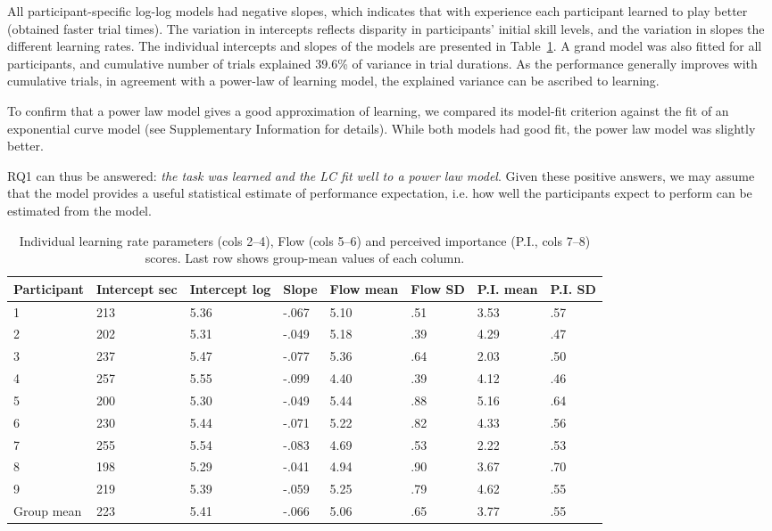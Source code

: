 All participant-specific log-log models had negative slopes, which indicates that with experience each participant learned to play better (obtained faster trial times). The variation in intercepts reflects disparity in participants' initial skill levels, and the variation in slopes the different learning rates. The individual intercepts and slopes of the models are presented in Table~\ref{tab:LCxFlow}. A grand model was also fitted for all participants, and cumulative number of trials explained 39.6\% of variance in trial durations. As the performance generally improves with cumulative trials, in agreement with a power-law of learning model, the explained variance can be ascribed to learning.

To confirm that a power law model gives a good approximation of learning, we compared its model-fit criterion against the fit of an exponential curve model (see Supplementary Information for details). While both models had good fit, the power law model was slightly better.

RQ1 can thus be answered: {\it the task was learned and the LC fit well to a power law model}. Given these positive answers, we may assume that the model provides a useful statistical estimate of performance expectation, i.e. how well the participants expect to perform can be estimated from the model.

\begin{table}[ht]
\centering
\caption{\label{tab:LCxFlow}Individual learning rate parameters (cols 2--4), Flow (cols 5--6) and perceived importance (P.I., cols 7--8) scores. Last row shows group-mean values of each column.}
\begin{tabular}{llllllll}
\hline
Participant & Intercept sec & Intercept log & Slope  & Flow mean & Flow SD & P.I. mean & P.I. SD \\
\hline
1           & 213     & 5.36      & -.067 & 5.10      & .51     & 3.53      & .57     \\
2           & 202     & 5.31      & -.049 & 5.18      & .39     & 4.29      & .47     \\
3           & 237     & 5.47      & -.077 & 5.36      & .64     & 2.03      & .50     \\
4           & 257     & 5.55      & -.099 & 4.40      & .39     & 4.12      & .46     \\
5           & 200     & 5.30      & -.049 & 5.44      & .88     & 5.16      & .64     \\
6           & 230     & 5.44      & -.071 & 5.22      & .82     & 4.33      & .56     \\
7           & 255     & 5.54      & -.083 & 4.69      & .53     & 2.22      & .53     \\
8           & 198     & 5.29      & -.041 & 4.94      & .90     & 3.67      & .70     \\
9           & 219     & 5.39      & -.059 & 5.25      & .79     & 4.62      & .55     \\
\hline
Group mean  & 223     & 5.41      & -.066 & 5.06      & .65    & 3.77      & .55    \\
\hline
\end{tabular}
\end{table}


